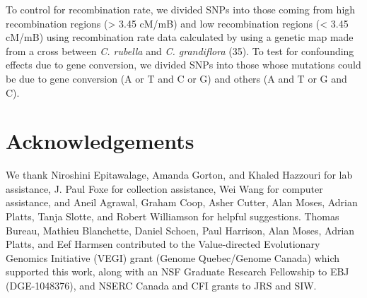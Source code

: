 To control for recombination rate, we divided SNPs into those coming from high recombination regions (> 3.45 cM/mB) and low recombination regions (< 3.45 cM/mB) using recombination rate data calculated by using a genetic map made from a cross between \textit{C. rubella} and \textit{C. grandiflora} (35). To test for confounding effects due to gene conversion, we divided SNPs into those whose mutations could be due to gene conversion (A or T and C or G) and others (A and T or G and C).

\section{Acknowledgements}
We thank Niroshini Epitawalage, Amanda Gorton, and Khaled Hazzouri for lab assistance, J. Paul Foxe for collection assistance, Wei Wang for computer assistance, and Aneil Agrawal, Graham Coop, Asher Cutter, Alan Moses, Adrian Platts, Tanja Slotte, and Robert Williamson for helpful suggestions. Thomas Bureau, Mathieu Blanchette, Daniel Schoen, Paul Harrison, Alan Moses, Adrian Platts, and Eef Harmsen contributed to the Value-directed Evolutionary Genomics Initiative (VEGI) grant (Genome Quebec/Genome Canada) which supported this work, along with an NSF Graduate Research Fellowship to EBJ (DGE-1048376), and NSERC Canada and CFI grants to JRS and SIW. 

